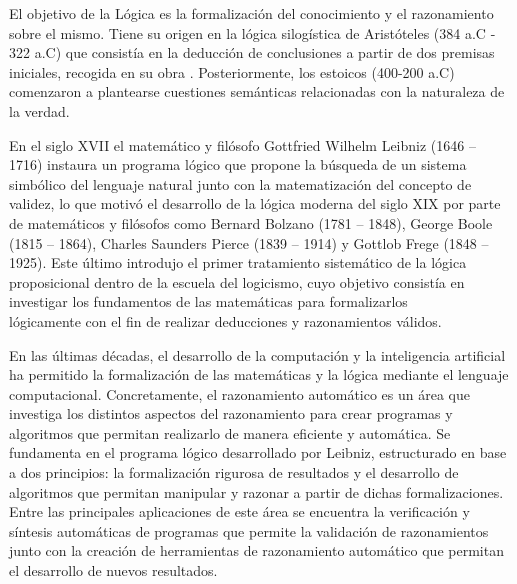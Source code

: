 %
\begin{isabellebody}%
%
%
\isadelimtheory
%
\endisadelimtheory
%
\isatagtheory
%
\endisatagtheory
{\isafoldtheory}%
%
\isadelimtheory
%
\endisadelimtheory
%
\begin{isamarkuptext}%
El objetivo de la Lógica es la formalización del conocimiento y el 
  razonamiento sobre el mismo. Tiene su origen en la lógica
  silogística de Aristóteles (384 a.C - 322 a.C) que consistía en la 
  deducción de conclusiones a partir de dos premisas iniciales, recogida 
  en su obra . Posteriormente, los estoicos (400-200 a.C) 
  comenzaron a plantearse cuestiones semánticas relacionadas con la 
  naturaleza de la verdad.

  En el siglo XVII el matemático y filósofo Gottfried Wilhelm 
  Leibniz (1646 – 1716) instaura un programa lógico que propone la 
  búsqueda de un sistema simbólico del lenguaje natural junto con la 
  matematización del concepto de validez, lo que motivó el desarrollo 
  de la lógica moderna del siglo XIX por parte de matemáticos y 
  filósofos como Bernard Bolzano (1781 – 1848), George Boole 
  (1815 – 1864), Charles Saunders Pierce (1839 – 1914) y Gottlob Frege 
  (1848 – 1925). Este último introdujo el primer tratamiento sistemático 
  de la lógica proposicional dentro de la escuela del logicismo, cuyo
  objetivo consistía en investigar los fundamentos de las matemáticas 
  para formalizarlos\\ lógicamente con el fin de realizar deducciones y 
  razonamientos válidos.

	En las últimas décadas, el desarrollo de la computación y la 
  inteligencia artificial ha permitido la formalización de las 
  matemáticas y la lógica mediante el lenguaje computacional. 
  Concretamente, el razonamiento automático es un área que investiga los
  distintos aspectos del razonamiento para crear programas y
  algoritmos que permitan realizarlo de manera eficiente y automática.
  Se fundamenta en el programa lógico desarrollado por Leibniz,
  estructurado en base a dos principios: la formalización rigurosa
  de resultados y el desarrollo de algoritmos que permitan manipular
  y razonar a partir de dichas formalizaciones. Entre las principales 
  aplicaciones de este área se encuentra la verificación y síntesis 
  automáticas de programas que permite la validación de razonamientos
  junto con la creación de herramientas de razonamiento automático 
  que permitan el desarrollo de nuevos resultados.


\end{isamarkuptext}
\end{isabellebody}
